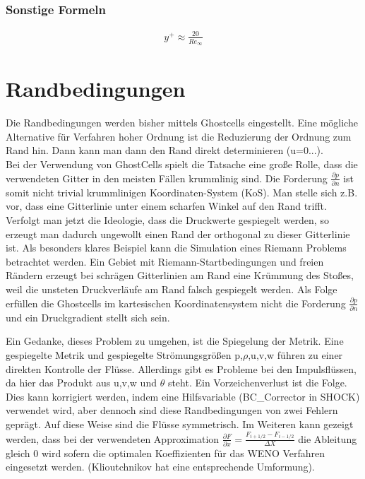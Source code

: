 \subsubsection{Sonstige Formeln}

\begin{align*}
 y^+ \approx \frac{20}{Re_\infty}
\end{align*}

\section{Randbedingungen}
Die Randbedingungen werden bisher mittels Ghostcells eingestellt. 
Eine mögliche Alternative für Verfahren hoher Ordnung ist die Reduzierung der Ordnung zum Rand hin. 
Dann kann man dann den Rand direkt determinieren (u=0...).\\
Bei der Verwendung von GhostCells spielt die Tatsache eine große Rolle, dass die verwendeten Gitter in den meisten Fällen krummlinig sind.
Die Forderung $\frac{\partial p}{\partial n}$ ist somit nicht trivial krummlinigen Koordinaten-System (KoS).
Man stelle sich z.B. vor, dass eine Gitterlinie unter einem scharfen Winkel auf den Rand trifft.
Verfolgt man jetzt die Ideologie, dass die Druckwerte gespiegelt werden, so erzeugt man dadurch ungewollt einen Rand der orthogonal zu dieser Gitterlinie ist.
Als besonders klares Beispiel kann die Simulation eines Riemann Problems betrachtet werden.
Ein Gebiet mit Riemann-Startbedingungen und freien Rändern erzeugt bei schrägen Gitterlinien am Rand eine Krümmung des Stoßes,
weil die unsteten Druckverläufe am Rand falsch gespiegelt werden.
Als Folge erfüllen die Ghostcells im kartesischen Koordinatensystem nicht die Forderung $\frac{\partial p}{\partial n}$ und ein Druckgradient stellt sich sein.
\par
Ein Gedanke, dieses Problem zu umgehen, ist die Spiegelung der Metrik.
Eine gespiegelte Metrik und gespiegelte Strömungsgrößen p,$\rho$,u,v,w führen zu einer direkten Kontrolle der Flüsse.
Allerdings gibt es Probleme bei den Impulsflüssen, da hier das Produkt aus u,v,w und $\theta$ steht.
Ein Vorzeichenverlust ist die Folge.
Dies kann korrigiert werden, indem eine Hilfsvariable (BC\_Corrector in SHOCK) verwendet wird, aber dennoch sind diese Randbedingungen von zwei Fehlern geprägt.
Auf diese Weise sind die Flüsse symmetrisch. 
Im Weiteren kann gezeigt werden, dass bei der verwendeten Approximation $\frac{\partial F}{\partial x}=\frac{F_{i+1/2}-F_{i-1/2}}{\varDelta X}$ die Ableitung gleich 0 wird sofern die optimalen Koeffizienten für das WENO Verfahren eingesetzt werden. (Klioutchnikov hat eine entsprechende Umformung).
